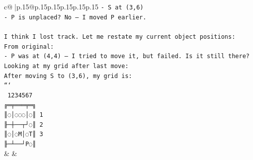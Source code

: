\documentclass{article}
\begin{document}
{\begin{supertabular}{c@{$\;$}|p{.15\linewidth}@{}p{.15\linewidth}p{.15\linewidth}p{.15\linewidth}p{.15\linewidth}p{.15\linewidth}}
{{{\texttt{{-} S at (3,6)  } \\
\texttt{{-} P is unplaced? No — I moved P earlier.  } \\
\\ 
\texttt{I think I lost track. Let me restate my current object positions:  } \\
\texttt{From original:  } \\
\texttt{{-} P was at (4,4) — I tried to move it, but failed. Is it still there?  } \\
\texttt{Looking at my grid after last move:  } \\
\texttt{After moving S to (3,6), my grid is:  } \\
\texttt{```} \\
\texttt{ 1234567} \\
\texttt{╔═╤═══╤═╗} \\
\texttt{║◌│◌◌◌│◌║ 1} \\
\texttt{╟─┼──┬┘◌║ 2} \\
\texttt{║◌│◌M│◌T║ 3} \\
\texttt{╟─┴──┘P◌║} \\
            }
        }
    }
    & & \\ \\


\end{supertabular}}
\end{document}
